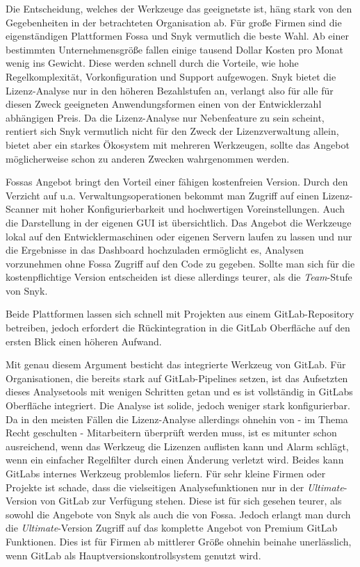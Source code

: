Die Entscheidung, welches der Werkzeuge das geeignetste ist, häng stark von den Gegebenheiten in der betrachteten Organisation ab. 
Für große Firmen sind die eigenständigen Plattformen Fossa und Snyk vermutlich die beste Wahl. Ab einer bestimmten Unternehmensgröße fallen einige tausend Dollar Kosten pro Monat wenig ins Gewicht. Diese werden schnell durch die Vorteile, wie hohe Regelkomplexität, Vorkonfiguration und Support aufgewogen. 
Snyk bietet die Lizenz-Analyse nur in den höheren Bezahlstufen an, verlangt also für alle für diesen Zweck geeigneten Anwendungsformen einen von der Entwicklerzahl abhängigen Preis. Da die Lizenz-Analyse nur Nebenfeature zu sein scheint, rentiert sich Snyk vermutlich nicht für den Zweck der Lizenzverwaltung allein, bietet aber ein starkes Ökosystem mit mehreren Werkzeugen, sollte das Angebot möglicherweise schon zu anderen Zwecken wahrgenommen werden.

Fossas Angebot bringt den Vorteil einer fähigen kostenfreien Version. Durch den Verzicht auf u.a. Verwaltungsoperationen bekommt man Zugriff auf einen Lizenz-Scanner mit hoher Konfigurierbarkeit und hochwertigen Voreinstellungen. Auch die Darstellung in der eigenen GUI ist übersichtlich. Das Angebot die Werkzeuge lokal auf den Entwicklermaschinen oder eigenen Servern laufen zu lassen und nur die Ergebnisse in das Dashboard hochzuladen ermöglicht es, Analysen vorzunehmen ohne Fossa Zugriff auf den Code zu gegeben. Sollte man sich für die kostenpflichtige Version entscheiden ist diese allerdings teurer, als die \emph{Team}-Stufe von Snyk.

Beide Plattformen lassen sich schnell mit Projekten aus einem GitLab-Repository betreiben, jedoch erfordert die Rückintegration in die GitLab Oberfläche auf den ersten Blick einen höheren Aufwand.

Mit genau diesem Argument besticht das integrierte Werkzeug von GitLab. Für Organisationen, die bereits stark auf GitLab-Pipelines setzen, ist das Aufsetzten dieses Analysetools mit wenigen Schritten getan und es ist vollständig in GitLabs Oberfläche integriert. Die Analyse ist solide, jedoch weniger stark konfigurierbar. Da in den meisten Fällen die Lizenz-Analyse allerdings ohnehin von - im Thema Recht geschulten - Mitarbeitern überprüft werden muss, ist es mitunter schon ausreichend, wenn das Werkzeug die Lizenzen auflisten kann und Alarm schlägt, wenn ein einfacher Regelfilter durch einen Änderung verletzt wird. Beides kann GitLabs internes Werkzeug problemlos liefern. 
Für sehr kleine Firmen oder Projekte ist schade, dass die vielseitigen Analysefunktionen nur in der \emph{Ultimate}-Version von GitLab zur Verfügung stehen. Diese ist für sich gesehen teurer, als sowohl die Angebote von Snyk als auch die von Fossa. Jedoch erlangt man durch die \emph{Ultimate}-Version Zugriff auf das komplette Angebot von Premium GitLab Funktionen. Dies ist für Firmen ab mittlerer Größe ohnehin beinahe unerlässlich, wenn GitLab als Hauptversionskontrollsystem genutzt wird. 

